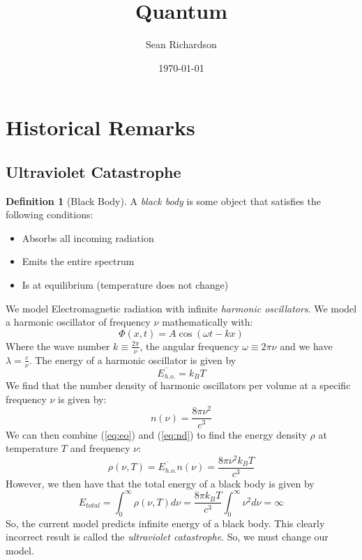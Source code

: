 \documentclass[11pt]{article}
\theoremstyle{definition}
\newtheorem{definition}[theorem]{Definition}
\begin{document}
\title{Quantum}
\author{Sean Richardson}
\date{\today}
\maketitle
\tableofcontents

\section{Historical Remarks}
\subsection{Ultraviolet Catastrophe}
\begin{definition}[Black Body]
    A \emph{black body} is some object that satisfies the following
    conditions:
\begin{itemize}
    \item Absorbs all incoming radiation
    \item Emits the entire spectrum
    \item Is at equilibrium (temperature does not change)
\end{itemize}
We model Electromagnetic radiation with infinite \emph{harmonic
oscillators}.
We model a harmonic oscillator of frequency $\nu$ mathematically with:
\begin{equation}
    \Phi(x,t) = A\cos(\omega t - kx)
    \tag{Harmonic Oscillator}
\end{equation}
Where the wave number $k \equiv \frac{2\pi}{\nu}$, the angular frequency
$\omega \equiv 2\pi \nu$ and we have $\lambda = \frac{c}{\nu}$.
The energy of a harmonic oscillator is given by
\begin{equation}
    \overline{E_{h.o.}} = k_B T
    \label{eq:eo}
\end{equation}
We find that the number density of harmonic oscillators per volume at a
specific frequency $\nu$ is given by:
\begin{equation}
    n(\nu) = \frac{8\pi \nu^2}{c^3}
    \label{eq:nd}
\end{equation}
We can then combine (\ref{eq:eo}) and (\ref{eq:nd}) to find the energy
density $\rho$ at temperature $T$ and frequency $\nu$:
\begin{equation*}
    \rho(\nu,T) = \overline{E_{h.o.}} n(\nu) = \frac{8\pi \nu^2 k_B T}{c^3}
\end{equation*}
However, we then have that the total energy of a black body is given by
\begin{equation*}
    E_{total} = \int_0^\infty \rho(\nu,T)d\nu = \frac{8 \pi k_B T}{c^3}
    \int_0^\infty \nu^2 d\nu = \infty
\end{equation*}
So, the current model predicts infinite energy of a black body. This
clearly incorrect result is called the \emph{ultraviolet catastrophe}. So,
we must change our model.
\end{definition}
\end{document}
